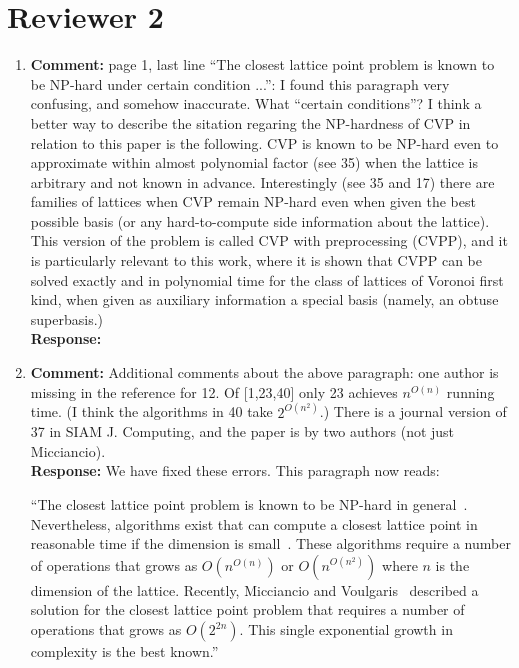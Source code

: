 \documentclass[a4paper,10pt]{article}
\begin{document}
\section*{Reviewer 2}\label{sec:reviewer-2}

\begin{enumerate}
\item\textbf{Comment:}  
page 1, last line ``The closest lattice point problem is known to be NP-hard under certain condition ...'': I found this paragraph very confusing, and somehow inaccurate. What ``certain conditions''? I think a better way to describe the sitation regaring the NP-hardness of CVP in relation to this paper is the following. CVP is known to be NP-hard even to approximate within almost polynomial factor (see 35) when the lattice is arbitrary and not known in advance. Interestingly (see 35 and 17) there are families of lattices when CVP remain NP-hard even when given the best possible basis (or any hard-to-compute side information about the lattice). This version of the problem is called CVP with preprocessing (CVPP), and it is particularly relevant to this work, where it is shown that CVPP can be solved exactly and in polynomial time for the class of lattices of Voronoi first kind, when given as auxiliary information a special basis (namely, an obtuse superbasis.) 
\\\textbf{Response:}

\item\textbf{Comment:}  
Additional comments about the above paragraph: one author is missing in the reference for 12. Of [1,23,40] only 23 achieves $n^{O(n)}$ running time. (I think the algorithms in 40 take $2^{O(n^2)}$.) There is a journal version of 37 in SIAM J. Computing, and the paper is by two authors (not just Micciancio). 
\\\textbf{Response:}
We have fixed these errors.  This paragraph now reads:

``The closest lattice point problem is known to be NP-hard in general~\cite{micciancio_hardness_2001, Dinur2003_approximating_CVP_NP_hard,Regev_2004_inappox_lattice_with_preprocessing,feige_inapproximability_2004,Jalden2005_sphere_decoding_complexity}. Nevertheless, algorithms exist that can compute a closest lattice point in reasonable time if the dimension is small~\cite{Pohst_sphere_decoder_1981,Kannan1987_fast_general_np,Agrell2002}.  These algorithms require a number of operations that grows as $O(n^{O(n)})$ or $O(n^{O(n^2)})$ where $n$ is the dimension of the lattice.  Recently, Micciancio and Voulgaris~\cite{MicciancioVoulgaris_deterministic_jv_2013} described a solution for the closest lattice point problem that requires a number of operations that grows as $O(2^{2n})$.  This single exponential growth in complexity is the best known.''


\end{enumerate}
\end{document}
